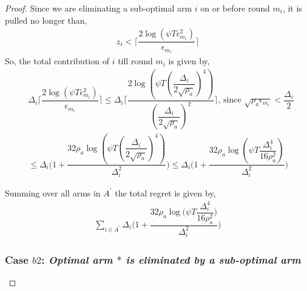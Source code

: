 \begin{proof}
 Since we are eliminating a sub-optimal arm ${i}$ on or before round $m_{i}$, it is pulled no longer than, 
 \begin{align*}
 z_{i} < \bigg\lceil\dfrac{2\log{(\psi T\epsilon_{m_{i}}^{2})}}{\epsilon_{m_{i}}}\bigg\rceil
 \end{align*}
So, the total contribution of ${i}$  till round $m_{i}$ is given by, 
\begin{align*}
&\Delta_{i}\bigg\lceil\dfrac{2\log{(\psi T\epsilon_{m_{i}}^{2})}}{\epsilon_{m_{i}}}\bigg\rceil
\leq\Delta_{i}\bigg\lceil\dfrac{2\log{(\psi T(\dfrac{\Delta_{i}}{2\sqrt{\rho_{a}}})^{4})}}{(\dfrac{\Delta_{i}}{2\sqrt{\rho_{a}}})^{2}}\bigg\rceil \text{, since } \sqrt{\rho_{a}\epsilon_{m_{i}}} < \dfrac{\Delta_{i}}{2}\\
&\leq\Delta_{i}\bigg(1+\dfrac{32\rho_{a}\log{(\psi T(\dfrac{\Delta_{i}}{2\sqrt{\rho_{a}}})^{4})}}{\Delta_{i}^{2}}\bigg)
\leq\Delta_{i}\bigg(1+\dfrac{32\rho_{a}\log{(\psi T\dfrac{\Delta_{i}^{4}}{16\rho_{a}^{2}})}}{\Delta_{i}^{2}}\bigg)
\end{align*} 
 
Summing over all arms in $A^{'}$ the total regret is given by, 
\begin{align*}
\sum_{i\in A^{'}}\Delta_{i}\bigg(1+\dfrac{32\rho_{a}\log{(\psi T\dfrac{\Delta_{i}^{4}}{16\rho_{a}^{2}}})}{\Delta_{i}^{2}}\bigg)
\end{align*}

\subsubsection*{Case $b2$: \textit{Optimal arm ${*}$ is eliminated by a sub-optimal arm  }}



\end{proof}
